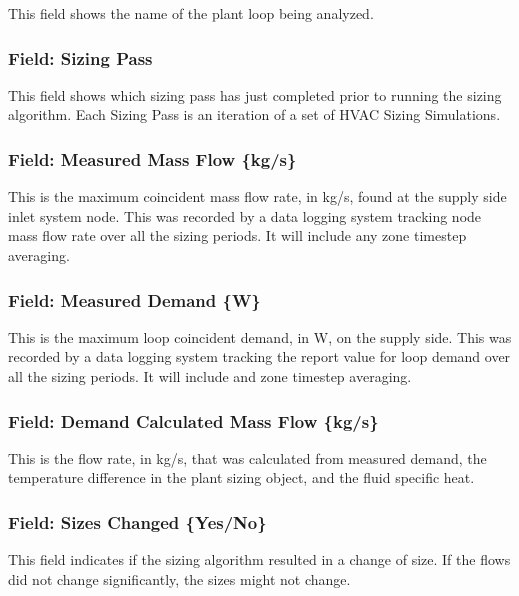 This field shows the name of the plant loop being analyzed.

\subsubsection{Field: Sizing Pass}\label{field-sizing-pass}

This field shows which sizing pass has just completed prior to running the sizing algorithm. Each Sizing Pass is an iteration of a set of HVAC Sizing Simulations.

\subsubsection{Field: Measured Mass Flow \{kg/s\}}\label{field-measured-mass-flow-kgs}

This is the maximum coincident mass flow rate, in kg/s, found at the supply side inlet system node. This was recorded by a data logging system tracking node mass flow rate over all the sizing periods. It will include any zone timestep averaging.

\subsubsection{Field: Measured Demand \{W\}}\label{field-measured-demand-w}

This is the maximum loop coincident demand, in W, on the supply side. This was recorded by a data logging system tracking the report value for loop demand over all the sizing periods. It will include and zone timestep averaging.

\subsubsection{Field: Demand Calculated Mass Flow \{kg/s\}}\label{field-demand-calculated-mass-flow-kgs}

This is the flow rate, in kg/s, that was calculated from measured demand, the temperature difference in the plant sizing object, and the fluid specific heat.

\subsubsection{Field: Sizes Changed \{Yes/No\}}\label{field-sizes-changed-yesno}

This field indicates if the sizing algorithm resulted in a change of size. If the flows did not change significantly, the sizes might not change.

